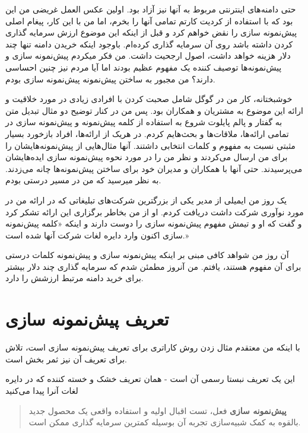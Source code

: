 حتی دامنه‌های اینترنتی مربوط به آنها نیز آزاد بود. اولین عکس العمل غریضی
من این بود که با استفاده از کردیت کارتم تمامی آنها را بخرم، اما من با
این کار، پیغام اصلی پیش‌نمونه سازی را نقض خواهم کرد و قبل از اینکه این
موضوع ارزش سرمایه گذاری کردن داشته باشد روی آن سرمایه گذاری کرده‌ام.
باوجود اینکه خریدن دامنه تنها چند دلار هزینه خواهد داشت، اصول ارجحیت
داشت. من فکر میکردم پیش‌نمونه سازی و پیش‌نمونه‌ها توصیف کننده یک مفهوم
عظیم بودند اما آیا مردم نیز چنین احساسی دارند؟ من مجبور به ساختن
پیش‌نمونه پیش‌نمونه سازی بودم.

خوشبختانه، کار من در گوگل شامل صحبت کردن با افرادی زیادی در مورد خلاقیت
و ارائه این موضوع به مشتریان و همکاران بود. پس من در کنار توضیح دو مثال
تبدیل متن به گفتار و پالم پایلوت شروع به استفاده از کلمه پیش‌نمونه و
پیش‌نمونه سازی در تمامی ارائه‌ها، ملاقات‌ها و بحث‌هایم کردم. در هریک از
ارائه‌ها، افراد بازخورد بسیار مثبتی نسبت به مفهوم و کلمات انتخابی
داشتند. آنها مثال‌هایی از پیش‌نمونه‌هایشان را برای من ارسال می‌کردند و
نظر من را در مورد نحوه پیش‌نمونه سازی ایده‌هایشان می‌پرسیدند. حتی آنها
با همکاران و مدیران خود برای ساختن پیش‌نمونه‌ها چانه می‌زدند. به نظر
میرسید که من در مسیر درستی بودم.

یک روز من ایمیلی از مدیر یکی از بزرگترین شرکت‌های تبلیغاتی که در ارائه
من در مورد نوآوری شرکت داشت دریافت کردم. او از من بخاطر برگزاری این
ارائه تشکر کرد و گفت که او و تیمش مفهوم پیش‌نمونه سازی را دوست دارند و
اینکه «کلمه پیش‌نمونه سازی اکنون وارد دایره لغات شرکت آنها شده است.»

آن روز من شواهد کافی مبنی بر اینکه پیش‌نمونه سازی و پیش‌نمونه کلمات
درستی برای آن مفهوم هستند، یافتم. من آنروز مطمئن شدم که سرمایه گذاری چند
دلار بیشتر برای خرید دامنه مرتبط ارزشش را دارد.

\section{تعریف پیش‌نمونه
سازی}\label{ux62aux639ux631ux6ccux641-ux67eux6ccux634ux646ux645ux648ux646ux647-ux633ux627ux632ux6cc}

با اینکه من معتقدم مثال زدن روش‌ کاراتری برای تعریف پیش‌نمونه سازی است،
تلاش برای تعریف آن نیز ثمر بخش است.

این یک تعریف نبستا رسمی آن است - همان تعریف خشک و خسته کننده که در دایره
لغات آنرا پیدا می‌کنید

\begin{quote}
\textbf{پیش‌نمونه سازی} فعل، تست اقبال اولیه و استفاده واقعی یک محصول
جدید بالقوه به کمک شبیه‌سازی تجربه آن بوسیله کمترین سرمایه گذاری ممکن
است.
\end{quote}


